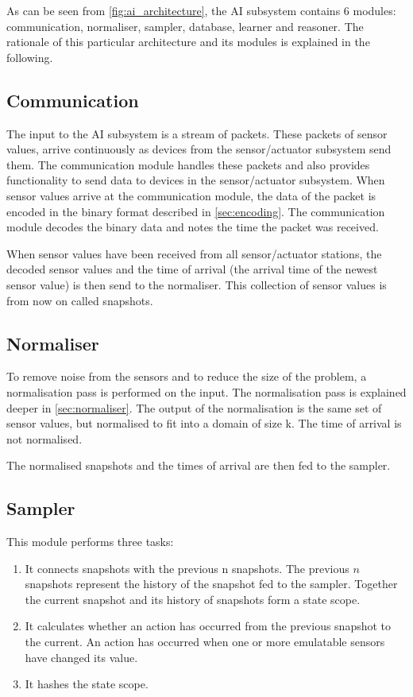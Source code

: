 As can be seen from \cref{fig:ai_architecture}, the AI subsystem contains 6 modules: communication, normaliser, sampler, database, learner and reasoner. The rationale of this particular architecture and its modules is explained in the following.

\subsection{Communication}
The input to the AI subsystem is a stream of packets. These packets of sensor values, arrive continuously as devices from the sensor/actuator subsystem send them. The communication module handles these packets and also provides functionality to send data to devices in the sensor/actuator subsystem. When sensor values arrive at the communication module, the data of the packet is encoded in the binary format described in \cref{sec:encoding}. The communication module decodes the binary data and notes the time the packet was received.

When sensor values have been received from all sensor/actuator stations, the decoded sensor values and the time of arrival (the arrival time of the newest sensor value) is then send to the normaliser. This collection of sensor values is from now on called snapshots.

\subsection{Normaliser}
To remove noise from the sensors and to reduce the size of the problem, a normalisation pass is performed on the input. The normalisation pass is explained deeper in \cref{sec:normaliser}. The output of the normalisation is the same set of sensor values, but normalised to fit into a domain of size k. The time of arrival is not normalised.

The normalised snapshots and the times of arrival are then fed to the sampler.

\subsection{Sampler}
This module performs three tasks:

\begin{enumerate}
\item It connects snapshots with the previous n snapshots. The previous $n$ snapshots represent the history of the snapshot fed to the sampler. Together the current snapshot and its history of snapshots form a state scope.
\item It calculates whether an action has occurred from the previous snapshot to the current. An action has occurred when one or more emulatable sensors have changed its value.
\item It hashes the state scope.
\end{enumerate}

